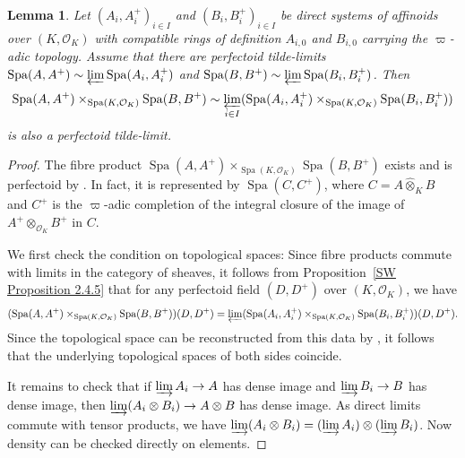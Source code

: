 \documentclass[10pt,oneside]{amsart}
\newtheorem{lemma}[theorem]{Lemma}
\theoremstyle{definition}
\renewcommand{\O}{\mathcal{O}}
\begin{document}
	\begin{lemma}\label{affinoid tilde-limits commute with fibre products}
		Let $(A_i, A_i^+)_{i\in I}$ and $(B_i, B_i^+)_{i\in I}$ be direct systems of affinoids over $(K, \mathcal O_K)$ with compatible rings of definition $A_{i,0}$ and $B_{i,0}$ carrying the $\varpi$-adic topology. Assume that there are perfectoid tilde-limits $\operatorname{Spa}(A, A^+)\sim \varprojlim \operatorname{Spa}(A_i, A_i^+)$ and $\operatorname{Spa}(B, B^+)\sim \varprojlim \operatorname{Spa}(B_i, B_i^+)$. Then \[\operatorname{Spa}(A, A^+)\times_{\operatorname{Spa}(K, \mathcal O_K)}\operatorname{Spa}(B, B^+)\sim\varprojlim_{i\in I} (\operatorname{Spa}(A_i, A_i^+)\times_{\operatorname{Spa}(K, \mathcal O_K)} \operatorname{Spa}(B_i, B_i^+))\]
		is also a perfectoid tilde-limit.
	\end{lemma}
	\begin{proof}
		The fibre product $\operatorname{Spa}(A, A^+)\times_{\operatorname{Spa}(K, \mathcal O_K)}\operatorname{Spa}(B, B^+)$ exists and is perfectoid by \cite[Proposition 6.18]{perfectoid}. In fact, it is represented by $\operatorname{Spa}(C,C^+)$, where $C=A\widehat{\otimes}_KB$ and $C^+$ is the $\varpi$-adic completion of the integral closure of the image of $A^+\otimes_{\mathcal O_K}B^+$ in $C$.
		
		We first check the condition on topological spaces:
		 Since fibre products commute with limits in the category of sheaves, it follows from Proposition~\ref{SW Proposition 2.4.5} that for any perfectoid field $(D,D^+)$ over $(K,\O_K)$, we have 
\[
 (\operatorname{Spa}(A, A^+)\times_{\operatorname{Spa}(K, \mathcal O_K)}\operatorname{Spa}(B, B^+))(D,D^+)=\varprojlim (\operatorname{Spa}(A_i, A_i^+)\times_{\operatorname{Spa}(K, \mathcal O_K)} \operatorname{Spa}(B_i, B_i^+))(D,D^+).
\]
 Since the topological space can be reconstructed from this data by \cite[Proposition~12.7, Lemma 15.6]{etale_cohomology_of_diamonds}, it follows that the underlying topological spaces of both sides coincide.
		
		It remains to check that if $\varinjlim A_i \rightarrow A$ has dense image and $\varinjlim B_i \rightarrow B$ has dense image, then $\varinjlim (A_i\otimes B_i) \rightarrow A\otimes B$ has dense image. As direct limits commute with tensor products, we have $\varinjlim (A_i\otimes B_i) = (\varinjlim A_i)\otimes (\varinjlim B_i)$. Now density can be checked directly on elements. 
	\end{proof}
\end{document}
